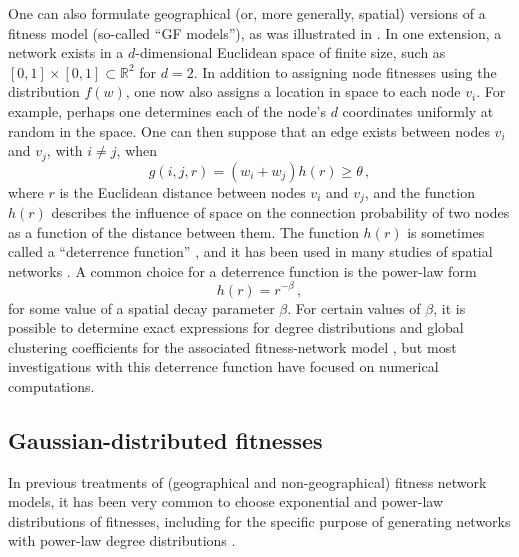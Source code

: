 \documentclass[%
 reprint,
 amsmath,amssymb,
 aps,
]{revtex4-1}
\begin{document}
One can also formulate geographical (or, more generally, spatial) versions of a fitness model (so-called ``GF models''), as was illustrated in \cite{geographical_threshold, boguna, caldarelli}. In one extension, a network exists in a $d$-dimensional Euclidean space of finite size, such as $[0, 1] \times [0, 1] \subset \mathbb{R}^2$ for $d = 2$. In addition to assigning node fitnesses using the distribution $f(w)$, one now also assigns a location in space to each node $v_i$. For example, perhaps one determines each of the node's $d$ coordinates uniformly at random in the space. One can then suppose that an edge exists between nodes $v_i$ and $v_j$, with $i \neq j$, when
\begin{equation}
    g(i, j, r) = (w_i + w_j)h(r) \geq \theta \,,
\end{equation}
where $r$ is the Euclidean distance between nodes $v_i$ and $v_j$, and the function $h(r)$ describes the influence of space on the connection probability of two nodes as a function of the distance between them. The function $h(r)$ is sometimes called a ``deterrence function'' \cite{barbosa}, and it has been used in many studies of spatial networks \cite{barthelemy}. A common choice for a deterrence function is the power-law form \cite{geographical_threshold}
\begin{equation}\label{distance_equation}
    h(r) = r^{-\beta}\,,
\end{equation}
for some value of a spatial decay parameter $\beta$. For certain values of $\beta$, it is possible to determine exact expressions for degree distributions and global clustering coefficients for the associated fitness-network model \cite{geographical_threshold}, but most investigations with this deterrence function have focused on numerical computations. 




\subsection{Gaussian-distributed fitnesses}

In previous treatments of (geographical and non-geographical) fitness network models, it has been very common to choose exponential and power-law distributions of fitnesses, including for the specific purpose of generating networks with power-law degree distributions \cite{geographical_threshold, geographical_threshold2, caldarelli, boguna}.
\end{document}
